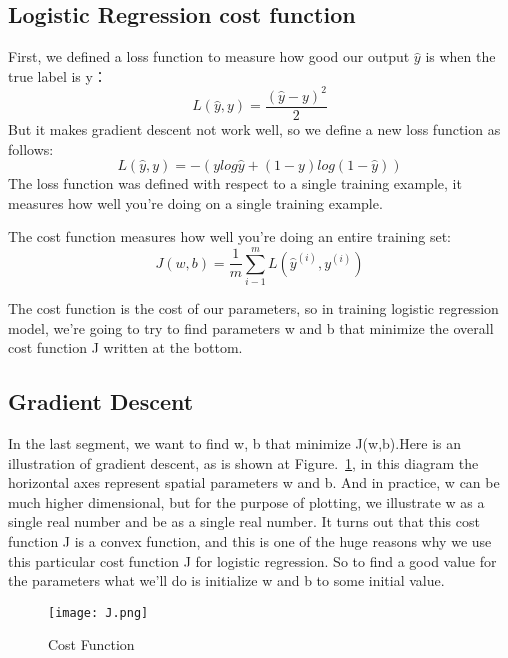 \documentclass[a4paper]{article}
\begin{document}
\subsection{Logistic Regression cost function}
\par First, we defined a loss function to measure how good our output $\hat{y}$ is when the true label is y：
\begin{equation}
L(\hat{y},y)=\frac{(\hat{y}-y)^{2}}{2}
\end{equation}
But it makes gradient descent not work well, so we define a new loss function as follows:
\begin{equation}
L(\hat{y},y)=-(ylog\hat{y}+(1-y)log(1-\hat{y}))
\end{equation}
The loss function was defined with respect to a single training example, it measures how well you're doing on a single training example.
\par The cost function measures how well you're doing an entire training set:
\begin{equation}
J(w,b)=\frac{1}{m}\sum_{i-1}^{m}L(\hat{y}^{(i)},y^{(i)})
\end{equation}
\par The cost function is the cost of our parameters, so in training logistic regression model, we're going to try to find parameters w and b that minimize the overall cost function J written at the bottom.
\subsection{Gradient Descent}
\par In the last segment, we want to find w, b that minimize J(w,b).Here is an illustration of gradient descent, as is shown at Figure.~\ref{J}, in this diagram the horizontal axes represent spatial parameters w and b. And in practice, w can be much higher dimensional, but for the purpose of plotting, we illustrate w as a single real number and be as a single real number. It turns out that this cost function J is a convex function, and this is one of the huge reasons why we use this particular cost function J for logistic regression. So to find a good value for the parameters what we'll do is initialize w and b to some initial value.
\begin{figure}[htbp]
	\begin{center}
		\texttt{[image: J.png]}
	\end{center}
	\caption{Cost Function}
	\label{J}
\end{figure}
\end{document}
